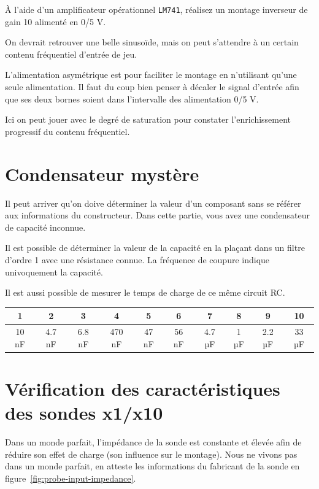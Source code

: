 \documentclass{../template/labo}
\begin{document}
À l'aide d'un amplificateur opérationnel \texttt{LM741}, réalisez un montage inverseur de gain 10 alimenté en 0/5 V.

{
	On devrait retrouver une belle sinusoïde, mais on peut s'attendre à un certain contenu fréquentiel d'entrée de jeu.

	L'alimentation asymétrique est pour faciliter le montage en n'utilisant qu'une seule alimentation.
	Il faut du coup bien penser à décaler le signal d'entrée afin que ses deux bornes soient dans l'intervalle des alimentation 0/5 V.
}

{
	Ici on peut jouer avec le degré de saturation pour constater l'enrichissement progressif du contenu fréquentiel.
}


\section{Condensateur mystère}
Il peut arriver qu'on doive déterminer la valeur d'un composant sans se référer aux informations du constructeur.
Dans cette partie, vous avez une condensateur de capacité inconnue.

{
	Il est possible de déterminer la valeur de la capacité en la plaçant dans un filtre d'ordre 1 avec une résistance connue. La fréquence de coupure indique univoquement la capacité.

	Il est aussi possible de mesurer le temps de charge de ce même circuit RC.

	\begin{center}
		\begin{tabular}{|c|c|c|c|c|c|c|c|c|c|}
		1 		& 2 		& 3 			& 4 		& 5 		& 6 		& 7 			& 8 	& 9 			& 10 \\
		\hline
		10 nF & 4.7 nF & 6.8 nF & 470 nF & 47 nF & 56 nF & 4.7 µF & 1 µF & 2.2 µF & 33 µF \\
		\end{tabular}
	\end{center}
}


\section{Vérification des caractéristiques des sondes x1/x10}
Dans un monde parfait, l'impédance de la sonde est constante et élevée afin de réduire son effet de charge (son influence sur le montage).
Nous ne vivons pas dans un monde parfait, en atteste les informations du fabricant de la sonde en figure~\ref{fig:probe-input-impedance}.
\end{document}
